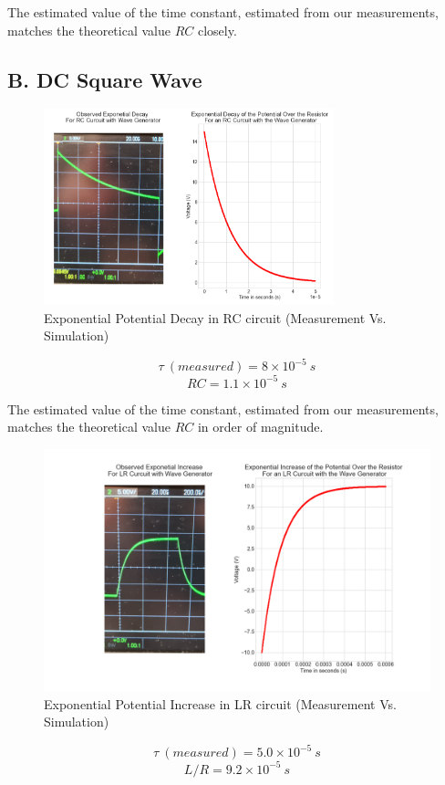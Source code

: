 \documentclass[a4paper,12pt]{article}
\begin{document}
The estimated value of the time constant, estimated from our measurements, matches the theoretical value $RC$ closely. 

\subsection*{B. DC Square Wave}

\begin{figure}[H]
  \centerline{\includegraphics[width=0.75\textwidth]{../Simulated Curves/RC_W-mod.png}}
  \caption{Exponential Potential Decay in RC circuit (Measurement Vs. Simulation)}
  \label{Combined_RC_W}
\end{figure}
$$\tau\ (measured) = 8 \times 10^{-5}\ s$$
$$RC = 1.1 \times 10^{-5}\ s$$

The estimated value of the time constant, estimated from our measurements, matches the theoretical value $RC$ in order of magnitude. 

\begin{figure}[H]
  \centerline{\includegraphics[width=0.9\linewidth]{../Simulated Curves/LR_W-mod.png}}
  \caption{Exponential Potential Increase in LR circuit (Measurement Vs. Simulation)}
  \label{Combined_LR_W}
\end{figure}
$$\tau\ (measured) = 5.0 \times 10^{-5}\ s$$
$$L/R = 9.2 \times 10^{-5}\ s$$
\end{document}
